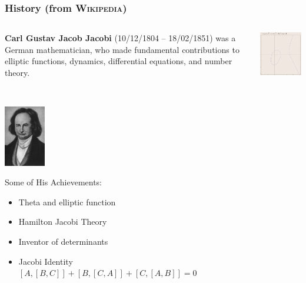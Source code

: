 \documentclass[handout]{beamer}%
\theoremstyle{definition}
\begin{document}
\begin{frame}
\frametitle{History (from \textsc{Wikipedia})}

\begin{columns}[c]
\begin{column}{6cm}
\begin{small}
\textbf{Carl Gustav Jacob Jacobi} (10/12/1804 -- 18/02/1851) was a German mathematician,
who made fundamental contributions to elliptic functions, dynamics, differential equations,
and number theory.
\end{small}\\
\centerline{\includegraphics[width=1.8cm]{images/Jacobi.jpg}}
\begin{scriptsize}\begin{block}{Some of His Achievements:}
\begin{itemize}
 \item Theta and elliptic function
 \item Hamilton Jacobi Theory
 \item Inventor of determinants
 \item Jacobi Identity
 \tiny{ $[A,[B,C]]+[B,[C,A]]+[C,[A,B]]=0$}
\end{itemize}
\end{block}\end{scriptsize}
\end{column}\pause
\begin{column}{6.5cm}\vspace*{-16.3pt}
\begin{center}
\includegraphics[width=5.5cm]{images/add1.pdf}\pause

\end{center}
\end{column}
\end{columns}
\end{frame}
\end{document}
